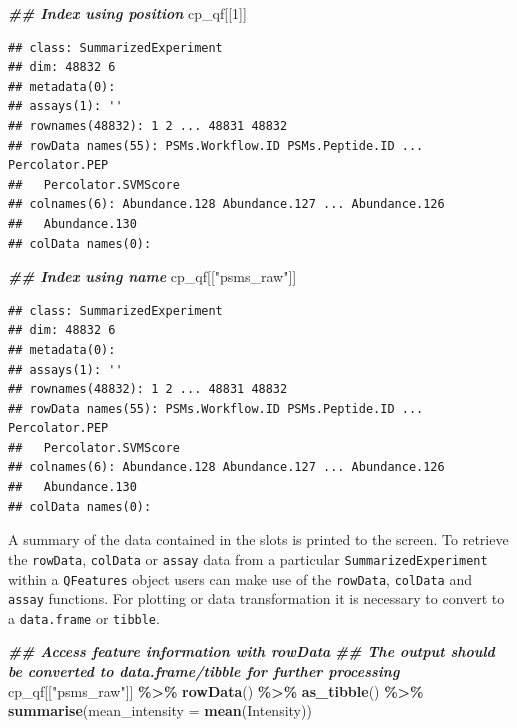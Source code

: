 \documentclass[9pt,a4paper,]{extarticle}
\newenvironment{Shaded}{\begin{snugshade}}{\end{snugshade}}
\newcommand{\AttributeTok}[1]{\textcolor[rgb]{0.13,0.29,0.53}{#1}}
\newcommand{\DecValTok}[1]{\textcolor[rgb]{0.00,0.00,0.81}{#1}}
\newcommand{\DocumentationTok}[1]{\textcolor[rgb]{0.56,0.35,0.01}{\textbf{\textit{#1}}}}
\newcommand{\FunctionTok}[1]{\textcolor[rgb]{0.13,0.29,0.53}{\textbf{#1}}}
\newcommand{\NormalTok}[1]{#1}
\newcommand{\SpecialCharTok}[1]{\textcolor[rgb]{0.81,0.36,0.00}{\textbf{#1}}}
\newcommand{\StringTok}[1]{\textcolor[rgb]{0.31,0.60,0.02}{#1}}
\begin{document}
\begin{Shaded}
\begin{Highlighting}[]
\DocumentationTok{\#\# Index using position}
\NormalTok{cp\_qf[[}\DecValTok{1}\NormalTok{]]}
\end{Highlighting}
\end{Shaded}

\begin{verbatim}
## class: SummarizedExperiment 
## dim: 48832 6 
## metadata(0):
## assays(1): ''
## rownames(48832): 1 2 ... 48831 48832
## rowData names(55): PSMs.Workflow.ID PSMs.Peptide.ID ... Percolator.PEP
##   Percolator.SVMScore
## colnames(6): Abundance.128 Abundance.127 ... Abundance.126
##   Abundance.130
## colData names(0):
\end{verbatim}

\begin{Shaded}
\begin{Highlighting}[]
\DocumentationTok{\#\# Index using name}
\NormalTok{cp\_qf[[}\StringTok{"psms\_raw"}\NormalTok{]]}
\end{Highlighting}
\end{Shaded}

\begin{verbatim}
## class: SummarizedExperiment 
## dim: 48832 6 
## metadata(0):
## assays(1): ''
## rownames(48832): 1 2 ... 48831 48832
## rowData names(55): PSMs.Workflow.ID PSMs.Peptide.ID ... Percolator.PEP
##   Percolator.SVMScore
## colnames(6): Abundance.128 Abundance.127 ... Abundance.126
##   Abundance.130
## colData names(0):
\end{verbatim}

A summary of the data contained in the slots is printed to the screen.
To retrieve the \texttt{rowData}, \texttt{colData} or \texttt{assay} data from a particular
\texttt{SummarizedExperiment} within a \texttt{QFeatures} object users can make use of the
\texttt{rowData}, \texttt{colData} and \texttt{assay} functions. For plotting or data transformation
it is necessary to convert to a \texttt{data.frame} or \texttt{tibble}.

\begin{Shaded}
\begin{Highlighting}[]
\DocumentationTok{\#\# Access feature information with rowData}
\DocumentationTok{\#\# The output should be converted to data.frame/tibble for further processing}
\NormalTok{cp\_qf[[}\StringTok{"psms\_raw"}\NormalTok{]] }\SpecialCharTok{\%\textgreater{}\%} 
  \FunctionTok{rowData}\NormalTok{() }\SpecialCharTok{\%\textgreater{}\%} 
  \FunctionTok{as\_tibble}\NormalTok{() }\SpecialCharTok{\%\textgreater{}\%} 
  \FunctionTok{summarise}\NormalTok{(}\AttributeTok{mean\_intensity =} \FunctionTok{mean}\NormalTok{(Intensity))}
\end{Highlighting}
\end{Shaded}
\end{document}
